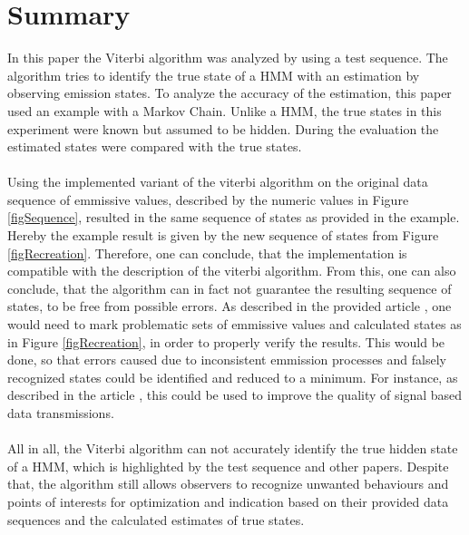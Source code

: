 \documentclass[12pt,journal,compsoc]{IEEEtran}
\begin{document}
\section{Summary}
In this paper the Viterbi algorithm was analyzed by using a test sequence. The algorithm tries to identify the true state of a HMM with an estimation by observing emission states. To analyze the accuracy of the estimation, this paper used an example with a Markov Chain. Unlike a HMM, the true states in this experiment were known but assumed to be hidden. During the evaluation the estimated states were compared with the true states.\\
\\
Using the implemented variant of the viterbi algorithm on the original data sequence of emmissive values,
described by the numeric values in Figure \ref{figSequence}, resulted in the same sequence of states as
provided in the example. Hereby the example result is given by the new sequence of states from Figure
\ref{figRecreation}. Therefore, one can conclude, that the implementation is compatible with the description
of the viterbi algorithm. From this, one can also conclude, that the algorithm can in fact not guarantee the
resulting sequence of states, to be free from possible errors. As described in the provided article
\cite{article:bissantz}, one would need to mark problematic sets of emmissive values and calculated states
as in Figure \ref{figRecreation}, in order to properly verify the results. This would be done, so that errors
caused due to inconsistent emmission processes and falsely recognized states could be identified and reduced
to a minimum. For instance, as described in the article \cite{article:bissantz}, this could be used to
improve the quality of signal based data transmissions.\\
\\
All in all, the Viterbi algorithm can not accurately identify the true hidden state of a HMM, which is highlighted by the test sequence and other papers. Despite that, the algorithm still allows observers to recognize unwanted behaviours and points of interests for optimization and indication based on their provided data sequences and the calculated estimates of true states.

\end{document}
